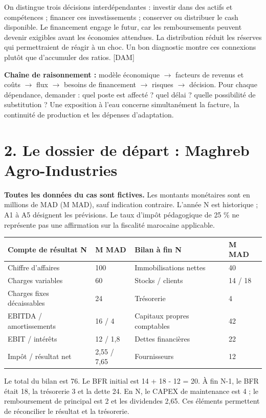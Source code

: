 \documentclass[12pt,a4paper]{article}
\begin{document}
On distingue trois décisions interdépendantes : investir dans des actifs et compétences ; financer ces investissements ; conserver ou distribuer le cash disponible. Le financement engage le futur, car les remboursements peuvent devenir exigibles avant les économies attendues. La distribution réduit les réserves qui permettraient de réagir à un choc. Un bon diagnostic montre ces connexions plutôt que d’accumuler des ratios. [DAM]


\textbf{Chaîne de raisonnement :} modèle économique $\rightarrow$ facteurs de revenus et coûts $\rightarrow$ flux $\rightarrow$ besoins de financement $\rightarrow$ risques $\rightarrow$ décision. Pour chaque dépendance, demander : quel poste est affecté ? quel délai ? quelle possibilité de substitution ? Une exposition à l’eau concerne simultanément la facture, la continuité de production et les dépenses d’adaptation.

\section*{2. Le dossier de départ : Maghreb Agro-Industries}
\textbf{Toutes les données du cas sont fictives.} Les montants monétaires sont en millions de MAD (M MAD), sauf indication contraire. L’année N est historique ; A1 à A5 désignent les prévisions. Le taux d’impôt pédagogique de 25 \% ne représente pas une affirmation sur la fiscalité marocaine applicable.



\Needspace{285pt}
\begin{longtable}{p{3.67cm}p{3.67cm}p{3.67cm}p{3.67cm}}
\toprule
Compte de résultat N & M MAD & Bilan à fin N & M MAD \\
\midrule\endhead
Chiffre d’affaires & 100 & Immobilisations nettes & 40 \\
Charges variables & 60 & Stocks / clients & 14 / 18 \\
Charges fixes décaissables & 24 & Trésorerie & 4 \\
EBITDA / amortissements & 16 / 4 & Capitaux propres comptables & 42 \\
EBIT / intérêts & 12 / 1,8 & Dettes financières & 22 \\
Impôt / résultat net & 2,55 / 7,65 & Fournisseurs & 12 \\
\bottomrule
\end{longtable}

Le total du bilan est 76. Le BFR initial est 14 + 18 - 12 = 20. À fin N-1, le BFR était 18, la trésorerie 3 et la dette 24. En N, le CAPEX de maintenance est 4 ; le remboursement de principal est 2 et les dividendes 2,65. Ces éléments permettent de réconcilier le résultat et la trésorerie.
\end{document}
